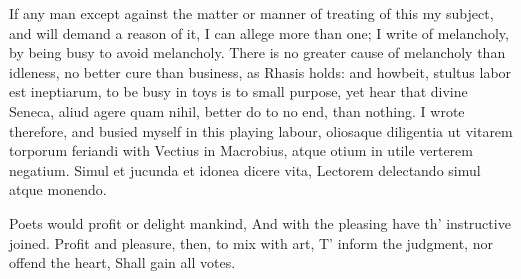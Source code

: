 {If any man except against the matter or manner of treating of this my
subject, and will demand a reason of it, I can allege more than one; I
write of melancholy, by being busy to avoid melancholy. There is no
greater cause of melancholy than idleness, no better cure than
business, as  Rhasis holds: and howbeit, stultus labor est
ineptiarum, to be busy in toys is to small purpose, yet hear that
divine Seneca, aliud agere quam nihil, better do to no end, than
nothing. I wrote therefore, and busied myself in this playing labour,
oliosaque diligentia ut vitarem torporum feriandi with Vectius in
Macrobius, atque otium in utile verterem negatium.
Simul et jucunda et idonea dicere vita,
Lectorem delectando simul atque monendo.

Poets would profit or delight mankind,
And with the pleasing have th' instructive joined.
Profit and pleasure, then, to mix with art,
T' inform the judgment, nor offend the heart,
Shall gain all votes.

}
